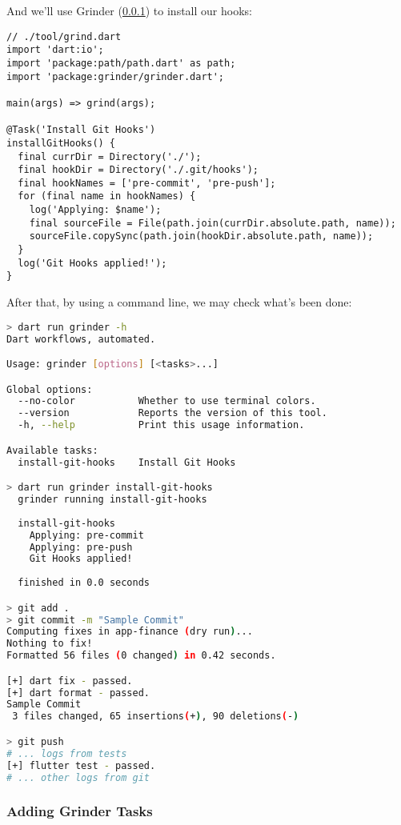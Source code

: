 \noindent And we'll use Grinder (\ref{a-grinder}) to install our hooks:

\begin{lstlisting}
// ./tool/grind.dart
import 'dart:io';
import 'package:path/path.dart' as path;
import 'package:grinder/grinder.dart';

main(args) => grind(args);

@Task('Install Git Hooks')
installGitHooks() {
  final currDir = Directory('./');
  final hookDir = Directory('./.git/hooks');
  final hookNames = ['pre-commit', 'pre-push'];
  for (final name in hookNames) {
    log('Applying: $name');
    final sourceFile = File(path.join(currDir.absolute.path, name));
    sourceFile.copySync(path.join(hookDir.absolute.path, name));
  }
  log('Git Hooks applied!');
}
\end{lstlisting}

\noindent After that, by using a command line, we may check what's been done:

\begin{lstlisting}[language=bash]
> dart run grinder -h
Dart workflows, automated.

Usage: grinder [options] [<tasks>...]

Global options:
  --no-color           Whether to use terminal colors.
  --version            Reports the version of this tool.
  -h, --help           Print this usage information.

Available tasks:
  install-git-hooks    Install Git Hooks

> dart run grinder install-git-hooks
  grinder running install-git-hooks
  
  install-git-hooks
    Applying: pre-commit
    Applying: pre-push
    Git Hooks applied!
  
  finished in 0.0 seconds

> git add .
> git commit -m "Sample Commit"
Computing fixes in app-finance (dry run)...
Nothing to fix!
Formatted 56 files (0 changed) in 0.42 seconds.

[+] dart fix - passed.
[+] dart format - passed.
Sample Commit
 3 files changed, 65 insertions(+), 90 deletions(-)

> git push
# ... logs from tests
[+] flutter test - passed.
# ... other logs from git
\end{lstlisting}


\subsubsection{Adding Grinder Tasks} \label{a-grinder}

